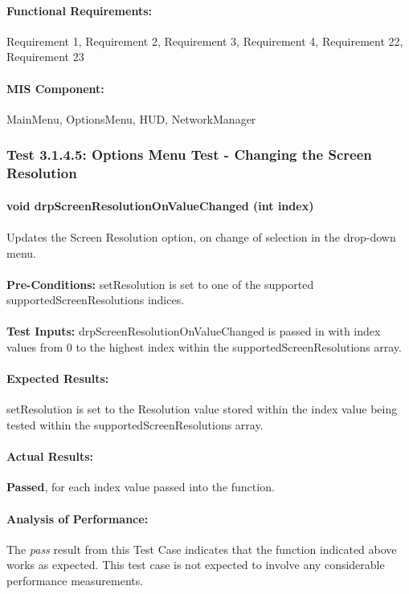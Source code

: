 \documentclass{article}
\begin{document}
    \paragraph{Functional Requirements:} Requirement 1, Requirement 2, Requirement 3, Requirement 4, Requirement 22, Requirement 23
    \paragraph{MIS Component:} MainMenu, OptionsMenu, HUD, NetworkManager
    
    \subsubsection{Test 3.1.4.5: Options Menu Test - Changing the Screen Resolution}
    \paragraph{}\textbf{void drpScreenResolutionOnValueChanged (int index)}
    \paragraph{} Updates the Screen Resolution option, on change of selection in the drop-down menu.
    \paragraph{}\textbf{Pre-Conditions:} setResolution is set to one of the supported supportedScreenResolutions indices.
    \paragraph{}\textbf{Test Inputs:} drpScreenResolutionOnValueChanged is passed in with index values from 0 to the highest index within the supportedScreenResolutions array.
    \paragraph{Expected Results:} setResolution is set to the Resolution value stored within the index value being tested within the supportedScreenResolutions array.
    \paragraph{Actual Results:} \textbf{Passed}, for each index value passed into the function.
    \paragraph{Analysis of Performance:} The \emph{pass} result from this Test Case indicates that the function indicated above works as expected. This test case is not expected to involve any considerable performance measurements.
\end{document}
